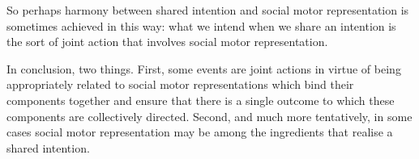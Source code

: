 \documentclass[12pt,\papersize]{extarticle}
\begin{document}
So perhaps harmony between shared intention and social motor representation is sometimes achieved in this way: what we intend when we share an intention is the sort of joint action that involves social motor representation.

In conclusion, two things.
First, some events are joint actions in virtue of being appropriately related to social motor representations which bind their components together and ensure that there is a single outcome to which these components are collectively directed.
Second, and much more tentatively, in some cases social motor representation may be among the ingredients that realise a shared intention.



\end{document}

